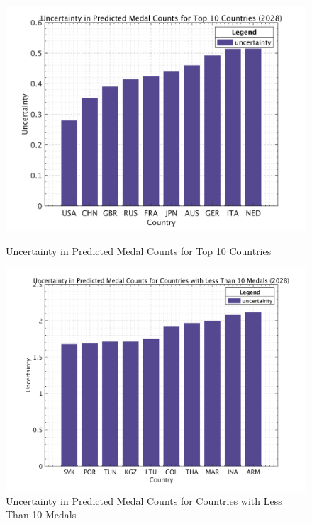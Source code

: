 \documentclass{mcmthesis}  %
\begin{document}
\begin{figure}[H]
    \centering
    \begin{minipage}{0.45\textwidth}
        \centering
        \includegraphics[width=\linewidth]{image/前10不确定度20250127T232946.png}
        \caption{Uncertainty in Predicted Medal Counts for Top 10 Countries}
    \end{minipage}\hfill
    \begin{minipage}{0.45\textwidth}
        \centering
        \includegraphics[width=\linewidth]{image/少于10不确定度20250127T233246.png}
        \caption{Uncertainty in Predicted Medal Counts for Countries with Less Than 10 Medals}
    \end{minipage}
\end{figure}
\end{document}
